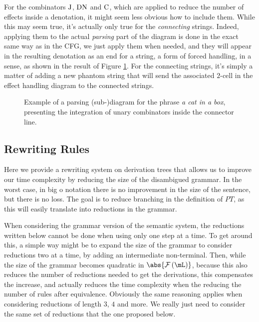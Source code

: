 \medskip

For the combinators $\text{J}$, $\text{DN}$ and $\text{C}$, which are applied to
reduce the number of effects inside a denotation, it might seem less obvious
how to include them.
While this may seem true, it's actually only true for the \emph{connecting}
strings.
Indeed, applying them to the actual \emph{parsing} part of the diagram is done
in the exact same way as in the CFG, we just apply them when needed, and they
will appear in the resulting denotation as an end for a string, a form of
forced handling, in a sense, as shown in the result of Figure
\ref{fig:parsing-diagram2}.
For the connecting strings, it's simply a matter of adding a new phantom string
that will send the associated $2$-cell in the effect handling diagram to 
the connected strings.

\begin{figure}
  \centering
  \caption{Example of a parsing (sub-)diagram for the phrase
  \emph{a cat in a box}, presenting the integration of unary combinators
  inside the connector line.}
  \label{fig:parsing-diagram2}
\end{figure}

\subsection{Rewriting Rules}
\label{subsec:rewrite}
Here we provide a rewriting system on derivation trees that allows us to
improve our time complexity by reducing the size of the disambigued grammar.
In the worst case, in big o notation there is no improvement in the size of the
sentence, but there is no loss.
The goal is to reduce branching in the definition of $PT$, as this will easily
translate into reductions in the grammar.

\medskip

When considering the grammar version of the semantic system, the reductions
written below cannot be done when using only one step at a time.
To get around this, a simple way might be to expand the size of the grammar to
consider reductions two at a time, by adding an intermediate non-terminal.
Then, while the size of the grammar becomes quadratic in
$\abs{\mFunc\left(\mL\right)}$, because this also reduces the number of
reductions needed to get the derivations, this compensates the increase, and
actually reduces the time complexity when the reducing the number of rules
after equivalence.
Obviously the same reasoning applies when considering reductions of length $3$,
$4$ and more.
We really just need to consider the same set of reductions that the one
proposed below.

